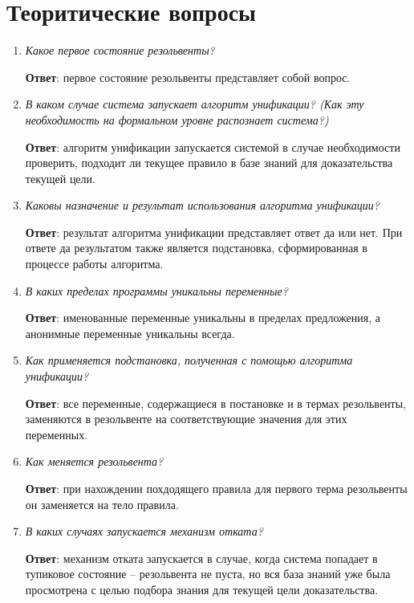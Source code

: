 {\large\section*{Теоритические вопросы}}

\begin{enumerate}
	\item \textit{Какое первое состояние резольвенты?}
	
	\qquad \textbf{Ответ}: первое состояние резольвенты представляет собой вопрос.

	\item \textit{В каком случае система запускает алгоритм унификации? (Как эту необходимость на формальном уровне распознает система?)}

	\qquad \textbf{Ответ}: алгоритм унификации запускается системой в случае необходимости проверить, подходит ли текущее правило в базе знаний для доказательства текущей цели.

	\item \textit{Каковы назначение и результат использования алгоритма унификации?}
	
	\qquad \textbf{Ответ}: результат алгоритма унификации представляет ответ да или нет. При ответе да результатом также является подстановка, сформированная в процессе работы алгоритма.
	
	\item \textit{В каких пределах программы уникальны переменные?}
	
	\qquad \textbf{Ответ}: именованные переменные уникальны в пределах предложения, а анонимные переменные уникальны всегда.

	\item \textit{Как применяется подстановка, полученная с помощью алгоритма унификации?}
	
	\qquad \textbf{Ответ}: все переменные, содержащиеся в постановке и в термах резольвенты, заменяются в резольвенте на соответствующие значения для этих переменных.

	\item \textit{Как меняется резольвента?}
	
	\qquad \textbf{Ответ}: при нахождении похдодящего правила для первого терма резольвенты он заменяется на тело правила.
	
	\item \textit{В каких случаях запускается механизм отката?}

	\qquad \textbf{Ответ}: механизм отката запускается в случае, когда система попадает в тупиковое состояние -- резольвента не пуста, но вся база знаний уже была просмотрена с целью подбора знания для текущей цели доказательства.
\end{enumerate}

